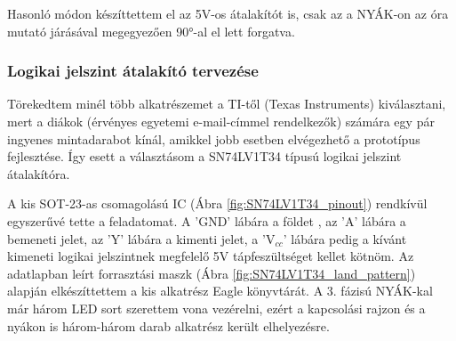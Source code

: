\documentclass[../main.tex]{subfiles}
\begin{document}
            Hasonló módon készíttettem el az 5V-os átalakítót is, csak az a NYÁK-on az óra mutató járásával megegyezően 90°-al el lett forgatva.
            
        \subsubsection{Logikai jelszint átalakító tervezése}
            Törekedtem minél több alkatrészemet a TI-től (Texas Instruments) kiválasztani, mert a diákok (érvényes egyetemi e-mail-címmel rendelkezők) számára egy pár ingyenes mintadarabot kínál, amikkel jobb esetben elvégezhető a prototípus fejlesztése. Így esett a választásom a SN74LV1T34 típusú logikai jelszint átalakítóra.
            
            \begin{figure}[h!]
                \begin{floatrow}
                \end{floatrow}
            \end{figure}
            
            
            A kis SOT-23-as csomagolású IC (Ábra \ref{fig:SN74LV1T34_pinout}) rendkívül egyszerűvé tette a feladatomat. A 'GND' lábára a földet , az 'A' lábára a bemeneti jelet, az 'Y' lábára a kimenti jelet, a 'V$_{cc}$' lábára pedig a kívánt kimeneti logikai jelszintnek megfelelő 5V tápfeszültséget kellet kötnöm. Az adatlapban leírt forrasztási maszk (Ábra \ref{fig:SN74LV1T34_land_pattern}) alapján elkészíttettem a kis alkatrész Eagle könyvtárát. A 3. fázisú NYÁK-kal már három LED sort szerettem vona vezérelni, ezért a kapcsolási rajzon és a nyákon is három-három darab alkatrész került elhelyezésre.
            
\end{document}

